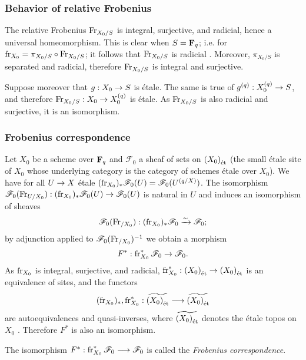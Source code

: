 \documentclass[deligne.tex]{subfiles}
\begin{document}
\subsubsection{Behavior of relative Frobenius}\label{sec:relFrobProp}
The relative Frobenius $\Fr_{X_0/S}$ is integral, surjective, and radicial, hence
a universal homeomorphism. This is clear when $S=\FF_q$;
i.e. for $\fr_{X_0}=\pi_{X_0/S}\circ\Fr_{X_0/S}$; it follows that
$\Fr_{X_0/S}$ is radicial \cite[I 3.5.6 (ii)]{EGA}.
Moreover, $\pi_{X_0/S}$ is separated and radicial, therefore
$\Fr_{X_0/S}$ is integral \cite[II 6.1.5 (v)]{EGA} and surjective.

Suppose moreover that $g:X_0\ra S$ is étale. The same is true of
$g^{(q)}:X_0^{(q)}\ra S$, and therefore $\Fr_{X_0/S}:X_0\ra X_0^{(q)}$ is étale.
As $\Fr_{X_0/S}$ is also radicial and surjective, it is an isomorphism.

\subsubsection{Frobenius correspondence}\label{sec:FrobCor}
Let $X_0$ be a scheme over $\FF_q$ and $\mathscr F_0$ a sheaf of sets on
$\et{(X_0)}$ (the small étale site of $X_0$ whose underlying category is the 
category of schemes étale over $X_0$).
We have for all $U\ra X$ étale $(\fr_{X_0})_\ast\mathscr F_0(U)=\mathscr F_0(U^{(q/X)})$.
The isomorphism $\mathscr F_0(\Fr_{U/X_0}):(\fr_{X_0})_\ast\mathscr F_0(U)\ra \mathscr F_0(U)$
is natural in $U$ and induces an isomorphism of sheaves
\begin{equation*}
    \mathscr F_0(\Fr_{/X_0}):(\fr_{X_0})_\ast\mathscr F_0\xrightarrow{\sim}\mathscr F_0;
\end{equation*}
by adjunction applied to $\mathscr F_0(\Fr_{/X_0})^{-1}$ we obtain a morphism
\begin{equation*}
    F^\ast : \fr_{X_0}^\ast \mathscr F_0\rightarrow\mathscr F_0.
\end{equation*}
As $\fr_{X_0}$ is integral, surjective, and radicial, $\fr_{X_0}^\ast:\et{(X_0)}\ra\et{(X_0)}$
is an equivalence of sites, and the functors
\begin{equation*}
    (\fr_{X_0})_\ast,\fr_{X_0}^\ast:\widetilde{\et{(X_0)}}\longrightarrow \widetilde{\et{(X_0)}}
\end{equation*}
are autoequivalences and quasi-inverses, where $\widetilde{\et{(X_0)}}$ denotes the
étale topos on $X_0$ \cite[Exp. VIII, 1.1]{SGAA}.
Therefore $F^\ast$ is also an isomorphism.
\begin{definition*}
    The isomorphism $F^\ast : \fr_{X_0}^\ast\mathscr F_0\longrightarrow\mathscr F_0$ is called
    the \emph{Frobenius correspondence}.
\end{definition*}
\end{document}
